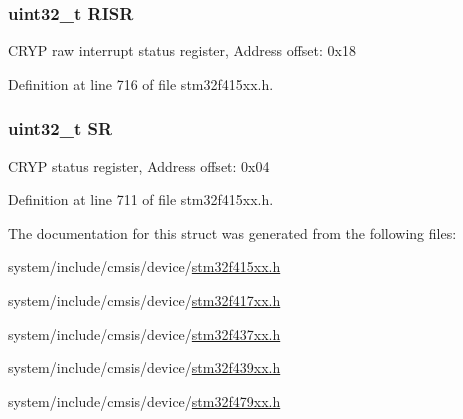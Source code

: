 \subsubsection[{\texorpdfstring{R\+I\+SR}{RISR}}]{ uint32\+\_\+t R\+I\+SR}\hypertarget{struct_c_r_y_p___type_def_aa196fddf0ba7d6e3ce29bdb04eb38b94}{}\label{struct_c_r_y_p___type_def_aa196fddf0ba7d6e3ce29bdb04eb38b94}
C\+R\+YP raw interrupt status register, Address offset\+: 0x18 

Definition at line 716 of file stm32f415xx.\+h.

\subsubsection[{\texorpdfstring{SR}{SR}}]{ uint32\+\_\+t SR}\hypertarget{struct_c_r_y_p___type_def_af6aca2bbd40c0fb6df7c3aebe224a360}{}\label{struct_c_r_y_p___type_def_af6aca2bbd40c0fb6df7c3aebe224a360}
C\+R\+YP status register, Address offset\+: 0x04 

Definition at line 711 of file stm32f415xx.\+h.



The documentation for this struct was generated from the following files\+:\begin{DoxyCompactItemize}
\item 
system/include/cmsis/device/\hyperlink{stm32f415xx_8h}{stm32f415xx.\+h}\item 
system/include/cmsis/device/\hyperlink{stm32f417xx_8h}{stm32f417xx.\+h}\item 
system/include/cmsis/device/\hyperlink{stm32f437xx_8h}{stm32f437xx.\+h}\item 
system/include/cmsis/device/\hyperlink{stm32f439xx_8h}{stm32f439xx.\+h}\item 
system/include/cmsis/device/\hyperlink{stm32f479xx_8h}{stm32f479xx.\+h}\end{DoxyCompactItemize}

